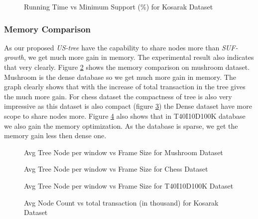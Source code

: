             \begin{figure}[h]
            \centering
                
            \caption{Running Time vs Minimum Support (\%) for Kosarak Dataset }
            \label{result:g_k_total}
            \end{figure}
            
\clearpage
    \subsubsection{Memory Comparison}
        As our proposed \emph{US-tree} have the capability to share nodes more than \emph{SUF-growth}, we get much more gain in memory. The experimental result also indicates that very clearly. Figure \ref{result:g_m_memory_node} shows the memory comparison on mushroom dataset. Mushroom is the dense database so we get  much more gain in memory. The graph clearly shows that with the increase of total transaction in the tree gives the much more gain. For chess dataset the compactness of tree is also very impressive as this dataset is also compact (figure \ref{result:g_chess_memory_node}) the Dense dataset have more scope to share nodes more. Figure \ref{result:g_t10_memory_node} also shows that in T40I10D100K database we also gain the memory optimization. As the database is sparse, we get the memory gain less then dense one.
            \begin{figure}[h]
            \centering
                
            \caption{Avg Tree Node per window vs Frame Size for Mushroom Dataset }
            \label{result:g_m_memory_node}
            \end{figure}
            
            \begin{figure}[h]
            \centering
                
            \caption{Avg Tree Node per window vs Frame Size for Chess Dataset }
            \label{result:g_chess_memory_node}
            \end{figure}
            
            \begin{figure}[h]
                
            \caption{Avg Tree Node per window vs Frame Size for T40I10D100K Dataset }
            \label{result:g_t10_memory_node}
            \end{figure}
        
            \begin{figure}[h]
            \centering
                
            \caption{Avg Node Count vs total transaction (in thousand) for Kosarak Dataset }
            \label{result:g_k_memory_node}
            \end{figure}